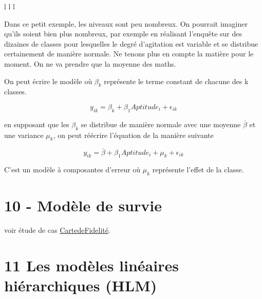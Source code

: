 \documentclass[
]{book}
\begin{document}
\begin{table}[ht]
\begin{centerbox}
\begin{threeparttable}
\begin{tabular}{l l l}
 \tabularnewline[-0.5pt]


\hhline{}
\end{tabular}
\end{threeparttable}\par\end{centerbox}

\end{table}
 

Dans ce petit exemple, les niveaux sont peu nombreux. On pourrait imaginer qu'ils soient bien plus nombreux, par exemple en réalisant l'enquête sur des dizaines de classes pour lesquelles le degré d'agitation est variable et se distribue certainement de manière normale. Ne tenons plus en compte la matière pour le moment. On ne va prendre que la moyenne des maths.

On peut écrire le modèle où \(\beta_{k}\) représente le terme constant de chacune des k classes.

\[ y_{ik}=\beta_{k}+\beta_{1}Aptitude_{i}+\epsilon_{ik} \]

en supposant que les \(\beta_{k}\) se distribue de manière normale avec une moyenne \(\overline{\beta}\) et une variance \(\mu_{k}\), on peut réécrire l'équation de la manière suivante

\[y_{ik}=\overline{\beta}+\beta_{1}Aptitude_{i}+\mu_{k}+\epsilon_{ik} \]

C'est un modèle à composantes d'erreur où \(\mu_{k}\) représente l'effet de la classe.

\hypertarget{section}{%
\subsection{}\label{section}}

\hypertarget{moduxe8le-de-survie}{%
\chapter{10 - Modèle de survie}\label{moduxe8le-de-survie}}

voir étude de cas \href{https://github.com/BenaventC/survival}{CartedeFidelité}.

\hypertarget{les-moduxe8les-linuxe9aires-hiuxe9rarchiques-hlm}{%
\chapter{11 Les modèles linéaires hiérarchiques (HLM)}\label{les-moduxe8les-linuxe9aires-hiuxe9rarchiques-hlm}}
\end{document}
